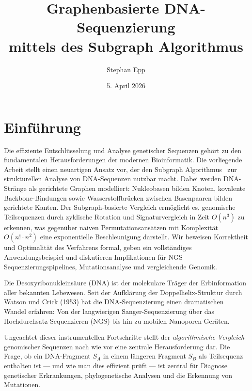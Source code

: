 ﻿\documentclass[a4paper,12pt]{article}
\title{Graphenbasierte DNA-Sequenzierung\\
       mittels des Subgraph Algorithmus}
\author{Stephan Epp}
\date{5. April 2026}
\theoremstyle{definition}
\begin{document}
\maketitle
\tableofcontents
\newpage

\section{Einf\"{u}hrung}
Die effiziente Entschl\"{u}sselung und Analyse genetischer Sequenzen geh\"{o}rt zu den
fundamentalen Herausforderungen der modernen Bioinformatik. Die vorliegende Arbeit
stellt einen neuartigen Ansatz vor, der den Subgraph Algorithmus~\cite{epp2026} zur
strukturellen Analyse von DNA-Sequenzen nutzbar macht. Dabei werden DNA-Str\"{a}nge als
gerichtete Graphen modelliert: Nukleobasen bilden Knoten, kovalente Backbone-Bindungen
sowie Wasserstoffbr\"{u}cken zwischen Basenpaaren bilden gerichtete Kanten. Der
Subgraph-basierte Vergleich erm\"{o}glicht es, genomische Teilsequenzen durch zyklische
Rotation und Signaturvergleich in Zeit $O(n^3)$ zu erkennen, was gegen\"{u}ber naiven
Permutationsans\"{a}tzen mit Komplexit\"{a}t $O(n! \cdot n^2)$ eine exponentielle
Beschleunigung darstellt. Wir beweisen Korrektheit und Optimalit\"{a}t des Verfahrens
formal, geben ein vollst\"{a}ndiges Anwendungsbeispiel und diskutieren Implikationen
f\"{u}r NGS-Sequenzierungspipelines, Mutationsanalyse und vergleichende Genomik.

Die Desoxyribonukleins\"{a}ure (DNA) ist der molekulare Tr\"{a}ger der Erbinformation
aller bekannten Lebewesen. Seit der Aufkl\"{a}rung der Doppelhelix-Struktur durch
Watson und Crick (1953) hat die DNA-Sequenzierung einen dramatischen Wandel erfahren:
Von der langwierigen Sanger-Sequenzierung \"{u}ber das Hochdurchsatz-Sequenzieren
(NGS) bis hin zu mobilen Nanoporen-Ger\"{a}ten.

Ungeachtet dieser instrumentellen Fortschritte stellt der \textit{algorithmische
Vergleich} genomischer Sequenzen nach wie vor eine zentrale Herausforderung dar.
Die Frage, ob ein DNA-Fragment $S_A$ in einem l\"{a}ngeren Fragment $S_B$ als
Teilsequenz enthalten ist --- und wie man dies effizient pr\"{u}ft --- ist zentral
f\"{u}r Diagnose genetischer Erkrankungen, phylogenetische Analysen und die
Erkennung von Mutationen.
\end{document}
